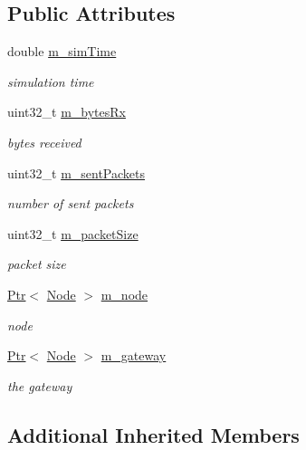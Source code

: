 \subsection*{Public Attributes}
\begin{DoxyCompactItemize}
\item 
double \hyperlink{classAcousticModemEnergyTestCase_a1d9e3ca9e65e9a76630d1d17f509a932}{m\+\_\+sim\+Time}
\begin{DoxyCompactList}\small\item\em simulation time \end{DoxyCompactList}\item 
uint32\+\_\+t \hyperlink{classAcousticModemEnergyTestCase_ac495120a94cd751178784b417141e593}{m\+\_\+bytes\+Rx}
\begin{DoxyCompactList}\small\item\em bytes received \end{DoxyCompactList}\item 
uint32\+\_\+t \hyperlink{classAcousticModemEnergyTestCase_a49500cd745308fd0b6fd3c607b13c624}{m\+\_\+sent\+Packets}
\begin{DoxyCompactList}\small\item\em number of sent packets \end{DoxyCompactList}\item 
uint32\+\_\+t \hyperlink{classAcousticModemEnergyTestCase_aad81603d0836ba952c5633e44e72dce8}{m\+\_\+packet\+Size}
\begin{DoxyCompactList}\small\item\em packet size \end{DoxyCompactList}\item 
\hyperlink{classns3_1_1Ptr}{Ptr}$<$ \hyperlink{classns3_1_1Node}{Node} $>$ \hyperlink{classAcousticModemEnergyTestCase_a70215894f46e0f4c11d7adb48fce7d44}{m\+\_\+node}
\begin{DoxyCompactList}\small\item\em node \end{DoxyCompactList}\item 
\hyperlink{classns3_1_1Ptr}{Ptr}$<$ \hyperlink{classns3_1_1Node}{Node} $>$ \hyperlink{classAcousticModemEnergyTestCase_a132723c335a308fc1d4be16bc79f49cf}{m\+\_\+gateway}
\begin{DoxyCompactList}\small\item\em the gateway \end{DoxyCompactList}\end{DoxyCompactItemize}
\subsection*{Additional Inherited Members}


